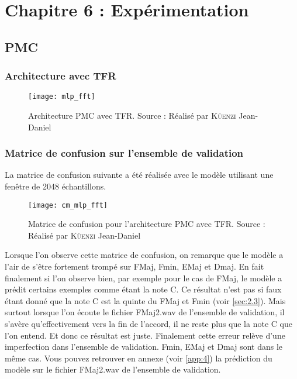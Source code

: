 \chapter{Chapitre 6 : Expérimentation}
\label{chap:6}

\section{PMC}
\label{sec:6.1}

\subsection{Architecture avec TFR}

\begin{figure}[H]
	\centering
	\texttt{[image: mlp\_fft]}
	\caption[Architecture PMC avec TFR]{Architecture PMC avec TFR. Source : Réalisé par \textsc{Küenzi} Jean-Daniel}
	\label{fig:mlp_fft}
\end{figure}

\subsection{Matrice de confusion sur l'ensemble de validation}
\label{subsec:6.1.2}

La matrice de confusion suivante a été réalisée avec le modèle utilisant une fenêtre de 2048 échantillons.

\begin{figure}[H]
	\centering
	\texttt{[image: cm\_mlp\_fft]}
	\caption[Matrice de confusion pour l'architecture PMC avec TFR]{Matrice de confusion pour l'architecture PMC avec TFR. Source : Réalisé par \textsc{Küenzi} Jean-Daniel}
	\label{fig:cm_mlp_fft}
\end{figure}

Lorsque l'on observe cette matrice de confusion, on remarque que le modèle a l'air de s'être fortement trompé sur FMaj, Fmin, EMaj et Dmaj. En fait finalement si l'on observe bien, par exemple pour le cas de FMaj, le modèle a prédit certains exemples comme étant la note C. Ce résultat n'est pas si faux étant donné que la note C est la quinte du FMaj et Fmin (voir \autoref{sec:2.3}). Mais surtout lorsque l'on écoute le fichier FMaj2.wav de l'ensemble de validation, il s'avère qu'effectivement vers la fin de l'accord, il ne reste plus que la note C que l'on entend. Et donc ce résultat est juste. Finalement cette erreur relève d'une imperfection dans l'ensemble de validation. Fmin, EMaj et Dmaj sont dans le même cas. Vous pouvez retrouver en annexe (voir \autoref{app:4}) la prédiction du modèle sur le fichier FMaj2.wav de l'ensemble de validation.

